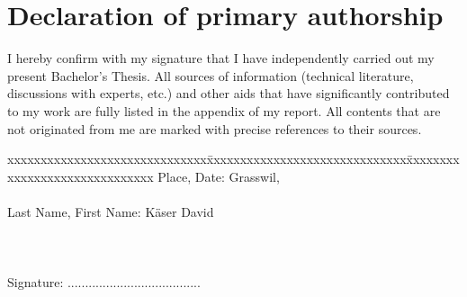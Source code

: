 \chapter*{Declaration of primary authorship}
\label{chap:declaration_authorship}

\vspace*{10mm} 

I hereby confirm with my signature that I have independently carried out my present Bachelor's Thesis. All sources of information (technical literature, discussions with experts, etc.) and other aids that have significantly contributed to my work are fully listed in the appendix of my report. All contents that are not originated from me are marked with precise references to their sources.

\vspace{15mm}

\begin{tabbing}
xxxxxxxxxxxxxxxxxxxxxxxxxxxxxx\=xxxxxxxxxxxxxxxxxxxxxxxxxxxxxx\=xxxxxxxxxxxxxxxxxxxxxxxxxxxxxx\kill
Place, Date:		\> Grasswil, \versiondate \\ \\ 
Last Name, First Name:	\> K\"aser David \\ \\ \\ \\ 
Signature:	\> ......................................\>
\end{tabbing}
